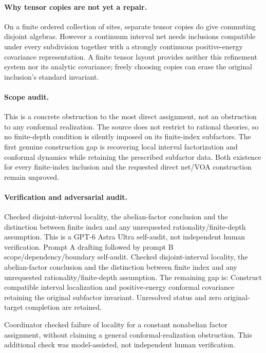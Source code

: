 \documentclass[11pt]{article}
\begin{document}
\paragraph{Why tensor copies are not yet a repair.} On a finite ordered collection of sites, separate tensor copies do give commuting disjoint algebras. However a continuum interval net needs inclusions compatible under every subdivision together with a strongly continuous positive-energy covariance representation. A finite tensor layout provides neither this refinement system nor its analytic covariance; freely choosing copies can erase the original inclusion's standard invariant.
\paragraph{Scope audit.} This is a concrete obstruction to the most direct assignment, not an obstruction to any conformal realization. The source does not restrict to rational theories, so no finite-depth condition is silently imposed on its finite-index subfactors. The first genuine construction gap is recovering local interval factorization and conformal dynamics while retaining the prescribed subfactor data. Both existence for every finite-index inclusion and the requested direct net/VOA construction remain unproved.

\paragraph{Verification and adversarial audit.}
Checked disjoint-interval locality, the abelian-factor conclusion and the distinction between finite index and any unrequested rationality/finite-depth assumption. This is a GPT-6 Astra Ultra self-audit, not independent human verification. Prompt A drafting followed by prompt B scope/dependency/boundary self-audit. Checked disjoint-interval locality, the abelian-factor conclusion and the distinction between finite index and any unrequested rationality/finite-depth assumption. The remaining gap is: Construct compatible interval localization and positive-energy conformal covariance retaining the original subfactor invariant. Unresolved status and zero original-target completion are retained.

Coordinator checked failure of locality for a constant nonabelian factor assignment, without claiming a general conformal-realization obstruction. This additional check was model-assisted, not independent human verification.
\end{document}
